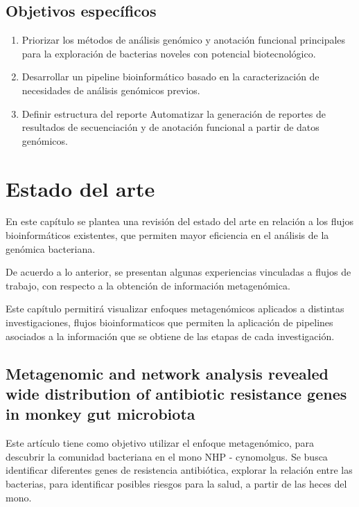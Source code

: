 \documentclass[12pt]{article}
\begin{document}
\subsection{Objetivos específicos}
\begin{enumerate}
    \item Priorizar los métodos de análisis genómico y anotación funcional 
        principales para la exploración de bacterias noveles con potencial biotecnológico.
    \item Desarrollar un pipeline bioinformático basado en la caracterización de 
        necesidades de análisis genómicos previos.
    \item Definir estructura del reporte Automatizar la generación de reportes de 
        resultados de secuenciación y de anotación funcional a partir de datos genómicos.
\end{enumerate}


\newpage
\section{Estado del arte}
En este  capítulo se plantea una revisión del estado del arte en relación a los flujos 
bioinformáticos existentes, que permiten mayor eficiencia en el análisis de la genómica 
bacteriana.

De acuerdo a lo anterior, se presentan algunas experiencias vinculadas a 
flujos de trabajo, con respecto  a la obtención de información metagenómica.

Este capítulo permitirá visualizar enfoques metagenómicos aplicados a 
distintas investigaciones, flujos bioinformaticos que permiten la aplicación de 
pipelines asociados a  la información que se obtiene de las etapas de cada investigación.

\subsection*{Metagenomic and network analysis revealed wide distribution of antibiotic resistance genes in monkey gut microbiota}
Este artículo tiene como objetivo utilizar el enfoque metagenómico, para descubrir la 
comunidad bacteriana en el mono NHP - cynomolgus. Se busca identificar diferentes genes de 
resistencia antibiótica, explorar la relación entre las bacterias, para identificar 
posibles riesgos para la salud, a partir de las heces del mono.
\end{document}
